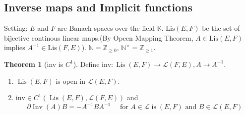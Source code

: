 \documentclass[12pt,a4paper]{book}
\newcommand{\bb}[1]{\mathbb{#1}}
\newenvironment{enu}{\begin{enumerate}[(1)]}{\end{enumerate}}
\theoremstyle{definition}
\newtheorem{theo}[defn]{Theorem}
\begin{document}
\subsection{Inverse maps and Implicit functions}
Setting: $E$ and $F$ are Banach spaces over the field $\mathbb{K}$.  
$\text{Lis}(E, F)$ be the set of bijective continous linear maps.(By Opeen Mapping Theorem, $A\in \text{Lis}(E,F)$ 
implies $A^{-1}\in\text{Lis}(F,E)$).  
$\bb{N}=\bb{Z}_{\ge 0}, \,\bb{N}^\times=\bb{Z}_{\ge 1}$.
\begin{theo}[inv is $C^1$]
Define $\text{inv}:\operatorname{Lis}(E, F)\rightarrow \mathcal{L}(F,E), A\rightarrow A^{-1}$.
\begin{enu} 
\item $\operatorname{Lis}(E, F)$ is open in $\mathcal{L}(E, F)$.
\item $\text{inv}\in C^1(\operatorname{Lis}(E, F),\mathcal{L}(F,E))$
and 
$$
\partial \operatorname{Inv}(A) B=-A^{-1} B A^{-1} \quad \text { for } A \in \mathcal{L} \operatorname{is}(E, F) \text { and } B \in \mathcal{L}(E, F)
$$
\end{enu}
\label{theorem: inv is C^1}
\end{theo}
\end{document}
